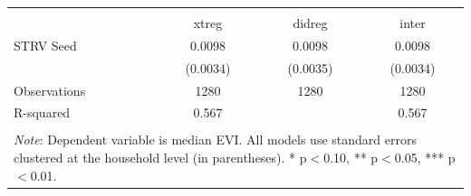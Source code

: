 \begin{tabular}{l*{3}{c}} 
\\[-1.8ex]\hline \hline \\[-1.8ex] 
& \multicolumn{1}{c}{xtreg} & 
\multicolumn{1}{c}{didreg} & 
\multicolumn{1}{c}{inter} \\ \midrule
\midrule
STRV Seed           &      0.0098\sym{***}&      0.0098\sym{***}&      0.0098\sym{***}\\
                    &    (0.0034)         &    (0.0035)         &    (0.0034)         \\
\midrule
Observations        &        1280         &        1280         &        1280         \\
R-squared           &       0.567         &                     &       0.567         \\
\hline \hline \\[-1.8ex] 
\multicolumn{4}{p{\linewidth}}{\small 
\noindent \textit{Note}: Dependent variable 
is median EVI. All models use 
standard errors clustered at the 
household level (in parentheses). 
* p$<$0.10, ** p$<$0.05, *** p$<$0.01.} 
\end{tabular}

